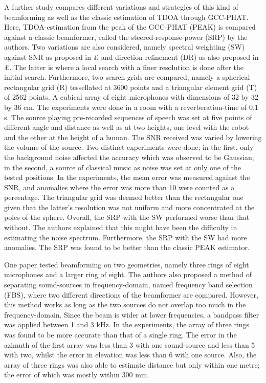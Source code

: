 \documentclass{report}
\begin{document}
A further study \cite{badali_evaluating_2009} compares different variations and strategies of this kind of beamforming as well as the classic estimation of TDOA through GCC-PHAT. Here, TDOA-estimation from the peak of the GCC-PHAT (PEAK) is compared against a classic beamformer, called the steered-response-power (SRP) by the authors. Two variations are also considered, namely spectral weighting (SW) against SNR as proposed in £ and direction-refinement (DR) as also proposed in £. The latter is where a local search with a finer resolution is done after the initial search. Furthermore, two search grids are compared, namely a spherical rectangular grid (R) tessellated at 3600 points and a triangular element grid (T) of 2562 points. A cubical array of eight microphones with dimensions of 32 by 32 by 36 \si{cm}. The experiments were done in a room with a reverberation-time of 0.1 \si{s}. The source playing pre-recorded sequences of speech was set at five points of different angle and distance as well as at two heights, one level with the robot and the other at the height of a human. The SNR received was varied by lowering the volume of the source. Two distinct experiments were done; in the first, only the background noise affected the accuracy which was observed to be Gaussian; in the second, a source of classical music as noise was set at only one of the tested positions. In the experiments, the mean error was measured against the SNR, and anomalies where the error was more than 10 \si{\deg} were counted as a percentage. The triangular grid was deemed better than the rectangular one given that the latter's resolution was not uniform and more concentrated at the poles of the sphere. Overall, the SRP with the SW performed worse than that without. The authors explained that this might have been the difficulty in estimating the noise spectrum. Furthermore, the SRP with the SW had more anomalies. The SRP was found to be better than the classic PEAK estimator.

One paper \cite{tamai_three_2005} tested beamforming on two geometries, namely three rings of eight microphones and a larger ring of eight. The authors also proposed a method of separating sound-sources in frequency-domain, named frequency band selection (FBS), where two different directions of the beamformer are compared. However, this method works as long as the two sources do not overlap too much in the frequency-domain. Since the beam is wider at lower frequencies, a bandpass filter was applied between 1 and 3 \si{kHz}. In the experiments, the array of three rings was found to be more accurate than that of a single ring. The error in the azimuth of the first array was less than 3 \si{\deg} with one sound-source and less than 5 \si{\deg} with two, whilst the error in elevation was less than 6 \si{\deg} with one source. Also, the array of three rings was also able to estimate distance but only within one metre; the error of which was mostly within 300 \si{mm}.
\end{document}
